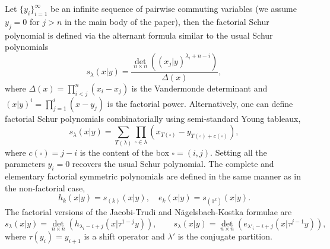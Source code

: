 \documentclass[12pt]{amsart}
\numberwithin{equation}{section}
\numberwithin{figure}{section}
\begin{document}
Let $\{y_i\}_{i=1}^{\infty}$ be an infinite sequence of pairwise commuting variables (we assume $y_j = 0$ for $j > n$ in the main body of the paper), then the factorial Schur polynomial is defined via the alternant formula similar to the usual Schur polynomials
\begin{equation}
    \label{factSchur}
    s_{\lambda}(x|y) = \frac{\underset{n \times n}{\det}((x_j|y)^{\lambda_i + n - i})}{\Delta(x)}, 
\end{equation}
where $\Delta(x) = \prod\limits_{i < j}^n (x_i - x_j)$ is the Vandermonde determinant and $(x|y)^{i} = \prod\limits_{j = 1}^i (x - y_j)$ is the factorial power. Alternatively, one can define factorial Schur polynomials combinatorially using semi-standard Young tableaux, 
\begin{equation}
    \label{tablformula}
    s_{\lambda}(x|y) = \sum\limits_{T(\lambda)}   \prod\limits_{\square \in \lambda} (x_{T(\square)} - y_{T(\square) + c(\square)}),
\end{equation}
where $c({\square}) = j - i$ is the content of the box $\square = (i,j)$. Setting all the parameters $y_i = 0$ recovers the usual Schur polynomial. The complete and elementary factorial symmetric polynomials are defined in the same manner as in the non-factorial case,
\begin{equation}
    \label{complelem}
    h_k(x|y) = s_{(k)}(x|y), \quad e_{k}(x|y) = s_{(1^k)}(x|y).
\end{equation}
The factorial versions of the Jacobi-Trudi and N\"{a}gelsbach-Kostka formulae are
\begin{equation}
    s_{\lambda}(x|y) = \underset{n \times n}{\det}(h_{\lambda_i-i+j}(x | \tau^{1-j}y)), \qquad s_{\lambda}(x|y) = \underset{n \times n}{\det}(e_{\lambda'_i - i +j }(x | \tau^{j - 1}y)),
\end{equation}
where $\tau(y_i) = y_{i + 1}$ is a shift operator and $\lambda'$ is the conjugate partition.
\end{document}
